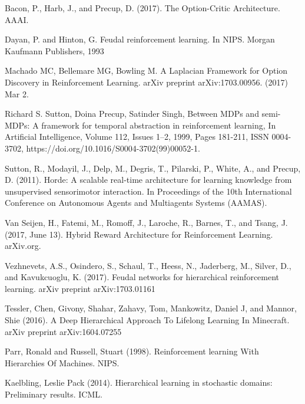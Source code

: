 \begin{thebibliography}{1}

\bibitem{} Bacon, P., Harb, J., and Precup, D. (2017). The Option-Critic Architecture. AAAI.

\bibitem{} Dayan, P. and Hinton, G. Feudal reinforcement learning. In NIPS. Morgan Kaufmann Publishers, 1993

\bibitem{} Machado MC, Bellemare MG, Bowling M. A Laplacian Framework for Option Discovery in
Reinforcement Learning. arXiv preprint arXiv:1703.00956. (2017) Mar 2.

\bibitem{} Richard S. Sutton, Doina Precup, Satinder Singh, Between MDPs and semi-MDPs: A framework for temporal abstraction in reinforcement learning, In Artificial Intelligence, Volume 112, Issues 1–2, 1999, Pages 181-211, ISSN 0004-3702, https://doi.org/10.1016/S0004-3702(99)00052-1.

\bibitem{} Sutton, R., Modayil, J., Delp, M., Degris, T., Pilarski, P., White, A., and Precup, D. (2011).
Horde: A scalable real-time architecture for learning knowledge from unsupervised
sensorimotor interaction. In Proceedings of the 10th International Conference on Autonomous
Agents and Multiagents Systems (AAMAS).

\bibitem{} Van Seijen, H., Fatemi, M., Romoff, J., Laroche, R., Barnes, T., and Tsang, J. (2017, June 13). Hybrid Reward Architecture for Reinforcement Learning. arXiv.org.

\bibitem{} Vezhnevets, A.S., Osindero, S., Schaul, T., Heess, N., Jaderberg, M., Silver, D., and Kavukcuoglu, K. (2017).
Feudal networks for hierarchical reinforcement learning. arXiv preprint arXiv:1703.01161

\bibitem{} Tessler, Chen, Givony, Shahar, Zahavy, Tom, Mankowitz,
Daniel J, and Mannor, Shie (2016).
A Deep Hierarchical Approach To Lifelong Learning In Minecraft. arXiv preprint arXiv:1604.07255

\bibitem{} Parr, Ronald and Russell, Stuart (1998). Reinforcement learning
With Hierarchies Of Machines. NIPS.

\bibitem{} Kaelbling, Leslie Pack (2014). Hierarchical learning in stochastic
domains: Preliminary results. ICML.

\end{thebibliography}